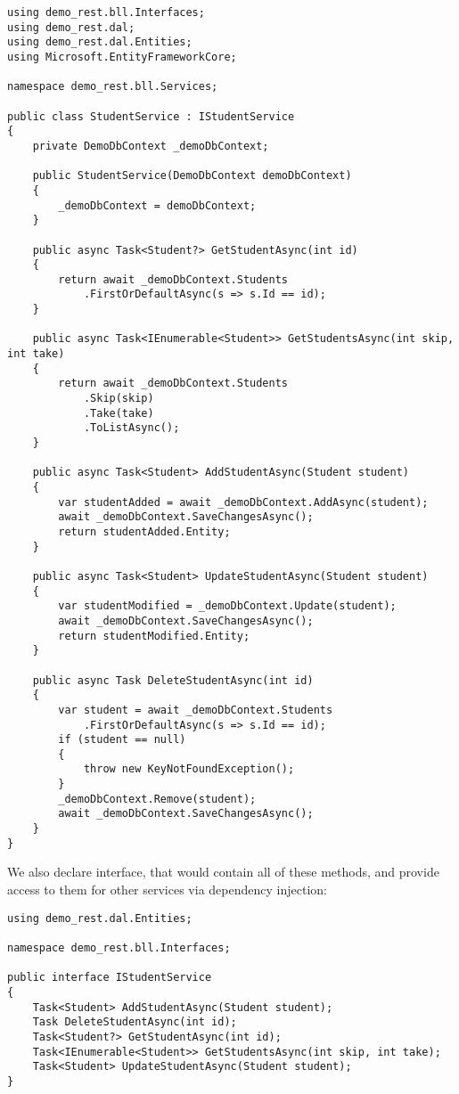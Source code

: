 \begin{lstlisting}
using demo_rest.bll.Interfaces;
using demo_rest.dal;
using demo_rest.dal.Entities;
using Microsoft.EntityFrameworkCore;

namespace demo_rest.bll.Services;

public class StudentService : IStudentService
{
    private DemoDbContext _demoDbContext;

    public StudentService(DemoDbContext demoDbContext)
    {
        _demoDbContext = demoDbContext;
    }

    public async Task<Student?> GetStudentAsync(int id)
    {
        return await _demoDbContext.Students
            .FirstOrDefaultAsync(s => s.Id == id);
    }

    public async Task<IEnumerable<Student>> GetStudentsAsync(int skip, int take)
    {
        return await _demoDbContext.Students
            .Skip(skip)
            .Take(take)
            .ToListAsync();
    }

    public async Task<Student> AddStudentAsync(Student student)
    {
        var studentAdded = await _demoDbContext.AddAsync(student);
        await _demoDbContext.SaveChangesAsync();
        return studentAdded.Entity;
    }

    public async Task<Student> UpdateStudentAsync(Student student)
    {
        var studentModified = _demoDbContext.Update(student);
        await _demoDbContext.SaveChangesAsync();
        return studentModified.Entity;
    }

    public async Task DeleteStudentAsync(int id)
    {
        var student = await _demoDbContext.Students
            .FirstOrDefaultAsync(s => s.Id == id);
        if (student == null)
        {
            throw new KeyNotFoundException();
        }
        _demoDbContext.Remove(student);
        await _demoDbContext.SaveChangesAsync();
    }
}

\end{lstlisting}

We also declare interface, that would contain all of these methods, and provide access to them for other services via dependency injection:

\begin{lstlisting}
using demo_rest.dal.Entities;

namespace demo_rest.bll.Interfaces;

public interface IStudentService
{
    Task<Student> AddStudentAsync(Student student);
    Task DeleteStudentAsync(int id);
    Task<Student?> GetStudentAsync(int id);
    Task<IEnumerable<Student>> GetStudentsAsync(int skip, int take);
    Task<Student> UpdateStudentAsync(Student student);
}

\end{lstlisting}

